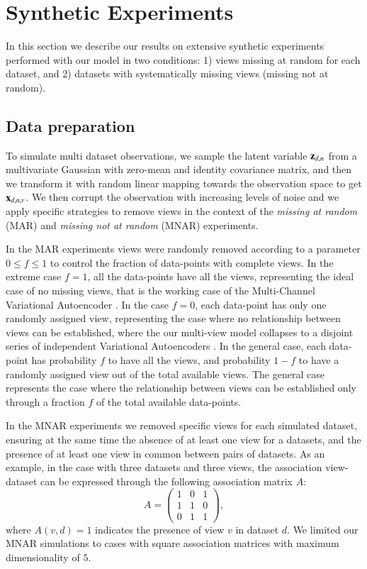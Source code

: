 \section{Synthetic Experiments}

In this section we describe our results on extensive synthetic experiments performed with our model in two conditions:
1) views missing at random for each dataset,
and 2) datasets with systematically missing views (missing not at random).

\subsection{Data preparation}
\label{ssec:synth}


To simulate multi dataset observations, we sample the latent variable $\mathbf{z}_{d,n}$ from a multivariate Gaussian with zero-mean and identity covariance matrix, and then we transform it with random linear mapping towards the observation space to get $\mathbf{x}_{d,n,v}$.
We then corrupt the observation with increasing levels of noise
and we apply specific strategies to remove views in the context of the \textit{missing at random} (MAR) and \textit{missing not at random} (MNAR) experiments.

In the MAR experiments views were randomly removed according to a parameter $0 \leq f \leq 1$ to control the fraction of data-points with complete views.
In the extreme case $f=1$, all the data-points have all the views, representing the ideal case of no missing views, that is the working case of the Multi-Channel Variational Autoencoder \citep{Antelmi2019}.
In the case $f=0$, each data-point has only one randomly assigned view, representing the case where no relationship between views can be established, where the our multi-view model collapses to a disjoint series of independent Variational Autoencoders \citep{Kingma2013, Rezende2014}.
In the general case, each data-point has probability $f$ to have all the views, and probability $1-f$ to have a randomly assigned view out of the total available views.
The general case represents the case where the relationship between views can be established only through a fraction $f$ of the total available data-points.

In the MNAR experiments we removed specific views for each simulated dataset, ensuring at the same time the absence of at least one view for a datasets, and the presence of at least one view in common between pairs of datasets.
As an example, in the case with three datasets and three views, the association view-dataset can be expressed through the following association matrix $A$:
\begin{equation}
A = 
\begin{pmatrix}
1 & 0 & 1 \\
1 & 1 & 0 \\
0 & 1 & 1 
\end{pmatrix},
\end{equation}
where $A(v,d)=1$ indicates the presence of view $v$ in dataset $d$.
We limited our MNAR simulations to cases with square association matrices with maximum dimensionality of $5$.

